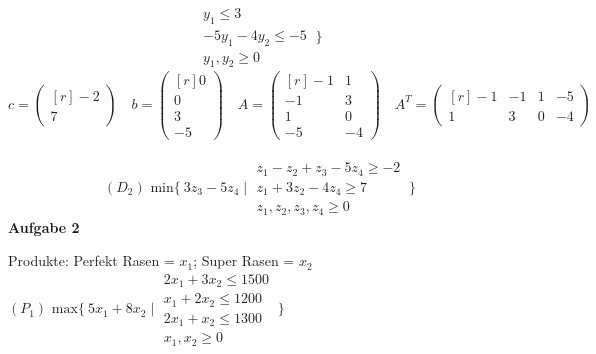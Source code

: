 \documentclass[a4paper,10pt]{article}
\begin{document}
\begin{enumerate}[a)]
\[\begin{matrix}
		y_1 \leq 3\\
		-5y_1 - 4y_2 \leq -5\\
		y_1, y_2 \geq 0
	\end{matrix}
	\ \}
	\]
	\[
	c = 
	\begin{pmatrix*}[r]
		-2\\
		7
	\end{pmatrix*}
	\quad
	b = 
	\begin{pmatrix*}[r]
		0\\
		0\\
		3\\
		-5
	\end{pmatrix*}
	\quad
	A = 
	\begin{pmatrix*}[r]
		-1 & 1\\
		-1 & 3\\
		1  & 0\\
		-5 & -4
	\end{pmatrix*}
	\quad
	A^T =
	\begin{pmatrix*}[r]
		-1 & -1 & 1 & -5\\
		1 & 3 & 0 & -4
	\end{pmatrix*}
	\]
	\\
	\[(D_2) \text{ min} \{\ 3z_3 - 5z_4 \mid 
	\begin{matrix}
		z_1 - z_2 + z_3 - 5z_4 \geq -2\\
		z_1 + 3z_2 -4z_4 \geq 7\\
		z_1, z_2, z_3, z_4 \geq 0
	\end{matrix}
	\ \}
	\]
	\newpage
	\textbf{Aufgabe 2}
	
	Produkte: Perfekt Rasen = $ x_1 $; Super Rasen = $ x_2 $\\
	
	$(P_1) \text{ max} \{\ 5x_1 + 8x_2 \mid \begin{matrix}
	2x_1 + 3x_2 \leq 1500\\
	x_1 + 2x_2 \leq 1200\\
	2x_1 + x_2 \leq 1300\\
	x_1, x_2 \geq 0
	\end{matrix}
	\ \}$\\\\
	

\end{enumerate}
\end{document}
